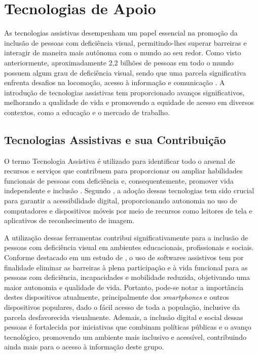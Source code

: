 \section{Tecnologias de Apoio}

As tecnologias assistivas desempenham um papel essencial na promoção da inclusão de pessoas com deficiência visual, permitindo-lhes superar barreiras e interagir de maneira mais autônoma com o mundo ao seu redor. Como visto anteriormente, aproximadamente 2,2 bilhões de pessoas em todo o mundo possuem algum grau de deficiência visual, sendo que uma parcela significativa enfrenta desafios na locomoção, acesso à informação e comunicação \cite{WHO2023}. A introdução de tecnologias assistivas tem proporcionado avanços significativos, melhorando a qualidade de vida e promovendo a equidade de acesso em diversos contextos, como a educação e o mercado de trabalho.

\subsection{Tecnologias Assistivas e sua Contribuição}

O termo Tecnologia Assistiva é utilizado para identificar todo o arsenal de recursos e serviços que contribuem para proporcionar ou ampliar habilidades funcionais de pessoas com deficiência e, consequentemente, promover vida independente e inclusão \cite{bersch2024}. Segundo , a adoção dessas tecnologias tem sido crucial para garantir a acessibilidade digital, proporcionando autonomia no uso de computadores e dispositivos móveis por meio de recursos como leitores de tela e aplicativos de reconhecimento de imagem.

A utilização dessas ferramentas contribui significativamente para a inclusão de pessoas com deficiência visual em ambientes educacionais, profissionais e sociais. Conforme destacado em um estudo de , o uso de softwares assistivos tem por finalidade eliminar as barreiras à plena participação e à vida funcional para as pessoas com deficiência, incapacidades e mobilidade reduzida, objetivando uma maior autonomia e qualidade de vida. Portanto, pode-se notar a importância destes dispositivos atualmente, principalmente dos \textit{smartphones} e outros dispositivos populares, dado o fácil acesso de toda a população, inclusive da parcela desfavorecida visualmente. Ademais, a inclusão digital e social dessas pessoas é fortalecida por iniciativas que combinam políticas públicas e o avanço tecnológico, promovendo um ambiente mais inclusivo e acessível, contribuindo ainda mais para o acesso à informação deste grupo.

